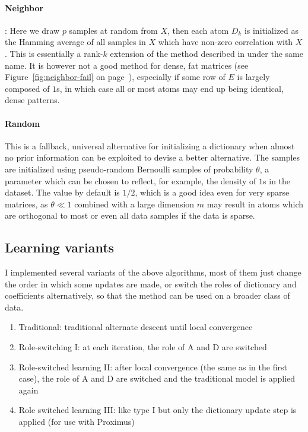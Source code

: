 \documentclass[twocolumn]{IEEEtran}
\begin{document}
\paragraph{Neighbor}: Here we draw $p$ samples at random from $X$, then each atom $D_k$ is initialized as the Hamming average of all samples in $X$ which have non-zero correlation with $X$. This is essentially a rank-$k$ extension of the method described in \cite{proximus} under the same name. It is however not a good method for dense, fat matrices (see Figure~\ref{fig:neighbor-fail} on page~\pageref{fig:neighbor-fail}), especially if some row of $E$ is largely composed of $1$s, in which case all or most atoms may end up being identical, dense patterns.

\paragraph{Random} This is a fallback, universal alternative for initializing a dictionary when almost no prior information can be exploited to devise a better alternative. The samples are initialized using pseudo-random Bernoulli samples of probability $\theta$, a parameter which can be chosen to reflect, for example, the density of $1$s in the dataset.  The value by default is $1/2$, which is a good idea even for very sparse matrices, as $\theta \ll 1$ combined with a large dimension $m$ may result in atoms which are orthogonal to most or even all data samples if the data is sparse.


\subsection{Learning variants}

I implemented several variants of the above algorithms, most of them just change the order in which some updates are made, or switch the roles of dictionary and coefficients alternatively, so that the method can be used on a broader class of data.
 

\begin{enumerate}
\item Traditional: traditional alternate descent until local convergence
\item Role-switching I: at each iteration, the role of A and D are switched
\item Role-switched learning II: after local convergence (the same as in the first case), the role of A and D are switched and the traditional model is applied again
\item Role switched learning III: like type I but only the dictionary update step is applied (for use with Proximus)
\end{enumerate}
\end{document}
